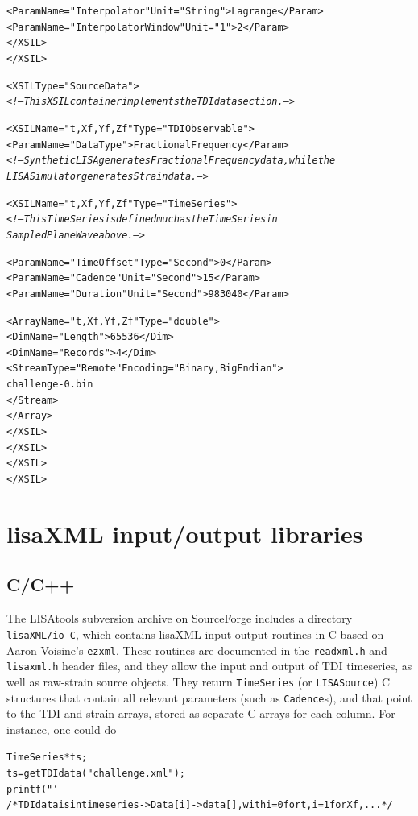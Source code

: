 \documentclass[11pt]{report}
\begin{document}
\begin{alltt}
            <Param Name="Interpolator" Unit="String">Lagrange</Param>
            <Param Name="InterpolatorWindow" Unit="1">2</Param>
        </XSIL>
    </XSIL>

    <XSIL Type="SourceData">
        \textsl{<!-- This XSIL container implements the TDI data section. -->}

        <XSIL Name="t,Xf,Yf,Zf" Type="TDIObservable">
            <Param Name="DataType">FractionalFrequency</Param>
            \textsl{<!-- Synthetic LISA generates FractionalFrequency data, while the
                 LISA Simulator generates Strain data. -->}

            <XSIL Name="t,Xf,Yf,Zf" Type="TimeSeries">
                \textsl{<!-- This TimeSeries is defined much as the TimeSeries in
                     SampledPlaneWave above. -->}

                <Param Name="TimeOffset" Type="Second">0</Param>
                <Param Name="Cadence" Unit="Second">15</Param>
                <Param Name="Duration" Unit="Second">983040</Param>

                <Array Name="t,Xf,Yf,Zf" Type="double">
                    <Dim Name="Length">65536</Dim>
                    <Dim Name="Records">4</Dim>
                    <Stream Type="Remote" Encoding="Binary,BigEndian">
                        challenge-0.bin
                    </Stream>
                </Array>
            </XSIL>
        </XSIL>
    </XSIL>
</XSIL>
\end{alltt}

\section{lisaXML input/output libraries}

\subsection{C/C++}

The LISAtools subversion archive on SourceForge includes a directory \texttt{lisaXML/io-C}, which contains lisaXML input-output routines in C based on Aaron Voisine's \texttt{ezxml}. These routines are documented in the \texttt{readxml.h} and \texttt{lisaxml.h} header files, and they allow the input and output of TDI timeseries, as well as raw-strain source objects. They return \texttt{TimeSeries} (or \texttt{LISASource}) C structures that contain all relevant parameters (such as \texttt{Cadence}s), and that point to the TDI and strain arrays, stored as separate C arrays for each column. For instance, one could do
%
\begin{alltt}
TimeSeries *ts;
ts = getTDIdata("challenge.xml");
printf("'%
/* TDI data is in timeseries->Data[i]->data[], with i=0 for t, i=1 for Xf, ... */

\end{alltt}
\end{document}
